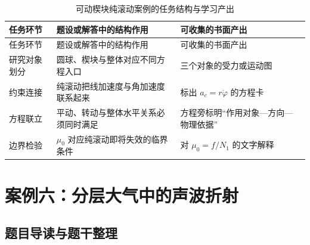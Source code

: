 \documentclass[
  12pt,
  a4paper,twoside,openany]{ctexbook}
\begin{document}
\begin{longtable}[]{@{}
  >{\raggedright\arraybackslash}p{}
  >{\raggedright\arraybackslash}p{}
  >{\raggedright\arraybackslash}p{}@{}}
\caption{可动楔块纯滚动案例的任务结构与学习产出}\tabularnewline
\toprule\noalign{}
\rowcolor{ThesisPale}
\begin{minipage}[b]{\linewidth}\raggedright
任务环节
\end{minipage} & \begin{minipage}[b]{\linewidth}\raggedright
题设或解答中的结构作用
\end{minipage} & \begin{minipage}[b]{\linewidth}\raggedright
可收集的书面产出
\end{minipage} \\
\midrule\noalign{}
\endfirsthead
\toprule\noalign{}
\rowcolor{ThesisPale}
\begin{minipage}[b]{\linewidth}\raggedright
任务环节
\end{minipage} & \begin{minipage}[b]{\linewidth}\raggedright
题设或解答中的结构作用
\end{minipage} & \begin{minipage}[b]{\linewidth}\raggedright
可收集的书面产出
\end{minipage} \\
\midrule\noalign{}
\endhead
\bottomrule\noalign{}
\endlastfoot
研究对象划分 & 圆球、楔块与整体对应不同方程入口 &
三个对象的受力或运动图 \\
约束连接 & 纯滚动把线加速度与角加速度联系起来 & 标出
\(a_c=r\ddot\varphi\) 的方程卡 \\
方程联立 & 平动、转动与整体水平关系必须同时满足 &
方程旁标明``作用对象---方向---物理依据'' \\
边界检验 & \(\mu_0\) 对应纯滚动即将失效的临界条件 & 对 \(\mu_0=f/N_1\)
的文字解释 \\
\end{longtable}

\section{案例六：分层大气中的声波折射}\label{ux6848ux4f8bux516dux5206ux5c42ux5927ux6c14ux4e2dux7684ux58f0ux6ce2ux6298ux5c04}

\subsection{题目导读与题干整理}\label{ux9898ux76eeux5bfcux8bfbux4e0eux9898ux5e72ux6574ux7406-5}
\end{document}
